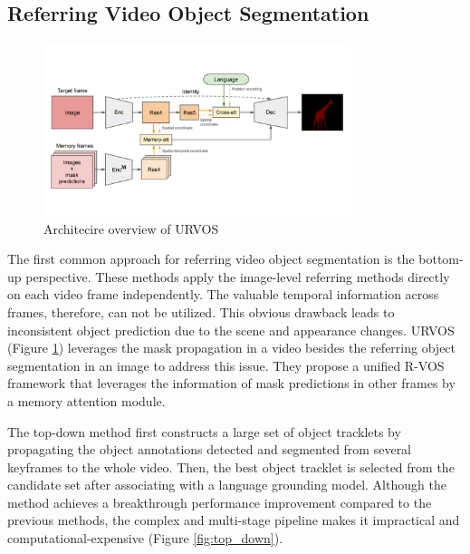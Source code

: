 \subsection{Referring Video Object Segmentation}


\begin{figure}
    \centering
    \includegraphics[width=0.8\textwidth]{content/resources/images/URVOS.pdf}
    \caption{Architecire overview of URVOS\cite{seo_urvos_2020}}
    \label{fig:urvos}
\end{figure}

The first common approach for referring video object segmentation is the bottom-up perspective. These methods apply the image-level referring methods \cite{seo_urvos_2020} directly on each video frame independently. The valuable temporal information across frames, therefore, can not be utilized. This obvious drawback leads to inconsistent object prediction due to the scene and appearance changes. URVOS \cite{seo_urvos_2020}(Figure \ref{fig:urvos}) leverages the mask propagation in a video besides the referring object segmentation in an image to address this issue. They propose a unified R-VOS framework that leverages the information of mask predictions in other frames by a memory attention module. 

The top-down method \cite{liang_rethinking_2021} first constructs a large set of object tracklets by propagating the object annotations detected and segmented from several keyframes to the whole video. Then, the best object tracklet is selected from the candidate set after associating with a language grounding model. Although the method achieves a breakthrough performance improvement compared to the previous methods, the complex and multi-stage pipeline makes it impractical and computational-expensive (Figure \ref{fig:top_down}).

